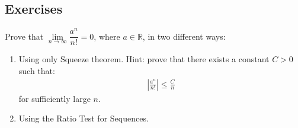 \documentclass[12pt]{book}
\theoremstyle{definition}
\begin{document}
\subsection{Exercises}

\begin{ex}{2.16}
Prove that $\lim\limits_{n\to \infty} \dfrac{a^n}{n!} =0$, where $a\in \mathbb{R}$, in two different ways:
\begin{enumerate}[label=(\alph*)]
	\item Using only Squeeze theorem. Hint: prove that there exists a constant $C >0$ such that:
	\begin{align*}
		\left|\frac{a^n}{n!}\right| \leq \frac{C}{n}
	\end{align*}
	for sufficiently large $n$.
	\item Using the Ratio Test for Sequences. 
\end{enumerate}	
\end{ex}
\end{document}
